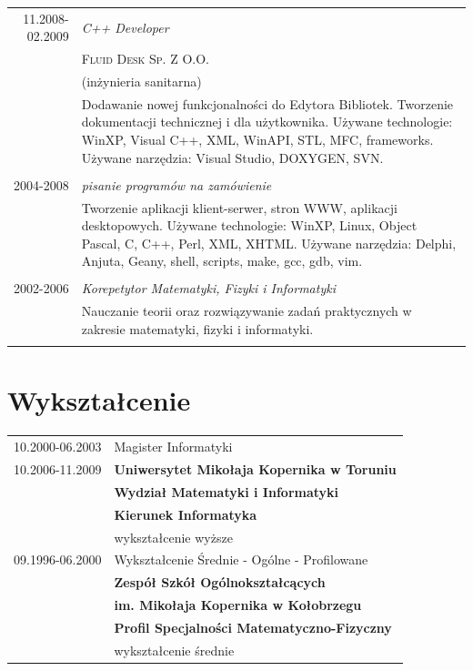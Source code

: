 \documentclass[a4paper,10pt]{article}
\begin{document}
\begin{tabular}{r|p{11cm}}
			 \textsc{11.2008-02.2009}
			 &\emph{C++ Developer} \\
			 &\textsc{Fluid Desk Sp. Z O.O.} \\
			 & (inżynieria sanitarna) \\
			 &\footnotesize{Dodawanie nowej funkcjonalności do Edytora Bibliotek. Tworzenie dokumentacji technicznej i dla użytkownika. 
							Używane technologie: WinXP, Visual C++, XML, WinAPI, STL, MFC, frameworks. Używane narzędzia: Visual Studio, 
							DOXYGEN, SVN.} \\
			 \multicolumn{2}{c}{} \\

			 \textsc{2004-2008}
			 &\emph{pisanie programów na zamówienie} \\
			 &\footnotesize{Tworzenie aplikacji klient-serwer, stron WWW, aplikacji desktopowych. Używane technologie: WinXP, Linux, 
							Object Pascal, C, C++, Perl, XML, XHTML. Używane narzędzia: Delphi, Anjuta, Geany, shell, scripts, make, 
							gcc, gdb, vim.}\\
			 \multicolumn{2}{c}{} \\

			 \textsc{2002-2006}
			 &\emph{Korepetytor Matematyki, Fizyki i Informatyki} \\
			 &\footnotesize{Nauczanie teorii oraz rozwiązywanie zadań praktycznych w zakresie matematyki, fizyki i informatyki.} \\
			 \multicolumn{2}{c}{} \\

    \end{tabular}

\section{Wykształcenie}
\begin{tabular}{rl}	
	\textsc{10.2000-06.2003}
		& Magister Informatyki \\
	\textsc{10.2006-11.2009}
		& \textbf{Uniwersytet Mikołaja Kopernika w Toruniu} \\
		& \textbf{Wydział Matematyki i Informatyki} \\
		& \textbf{Kierunek Informatyka} \\
		& wykształcenie wyższe \\

	\textsc{09.1996-06.2000}
		& Wykształcenie Średnie - Ogólne - Profilowane \\
		& \textbf{Zespół Szkół Ogólnokształcących} \\
		& \textbf{im. Mikołaja Kopernika w Kołobrzegu} \\
		& \textbf{Profil Specjalności Matematyczno-Fizyczny} \\
		& wykształcenie średnie \\
\end{tabular}
	
\end{document}
